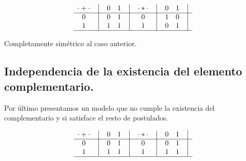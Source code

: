 \documentclass[final,12pt,a4paper,twoside,fleqn]{extbook}
\theoremstyle{definition}
\theoremstyle{remark}
\begin{document}
\begin{equation}
    \begin{matrix}
        {\cdot + \cdot} & \big{\vert} & {0} & {1} & \big{\vert} \\
        \hline
        {0}             & \big{\vert} & {0} & {1} & \big{\vert} \\
        {1}             & \big{\vert} & {1} & {1} & \big{\vert} \\
        \hline
    \end{matrix}
    \quad
    \begin{matrix}
        {\cdot * \cdot} & \big{\vert} & {0} & {1} & \big{\vert} \\
        \hline
        {0}                   & \big{\vert} & {1} & {0} & \big{\vert} \\
        {1}                   & \big{\vert} & {0} & {1} & \big{\vert} \\
        \hline
    \end{matrix}
\end{equation}



	Completamente simétrico al caso anterior.



\subsection{Independencia de la existencia del elemento complementario.}



	Por último presentamos un modelo que no cumple la existencia del
complementario y si satisface el resto de postulados.



\begin{equation}
    \begin{matrix}
        {\cdot + \cdot} & \big{\vert} & {0} & {1} & \big{\vert} \\
        \hline
        {0}             & \big{\vert} & {0} & {1} & \big{\vert} \\
        {1}             & \big{\vert} & {1} & {1} & \big{\vert} \\
        \hline
    \end{matrix}
    \quad
    \begin{matrix}
        {\cdot * \cdot} & \big{\vert} & {0} & {1} & \big{\vert} \\
        \hline
        {0}                   & \big{\vert} & {0} & {1} & \big{\vert} \\
        {1}                   & \big{\vert} & {1} & {1} & \big{\vert} \\
        \hline
    \end{matrix}
\end{equation}
\end{document}
